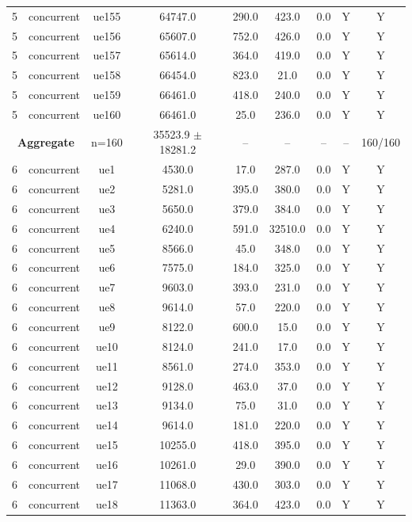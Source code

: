 \begin{table}[ht]
\begin{tabular}{|c|c|c|c|c|c|c|c|c|}
5 & concurrent & ue155 & 64747.0 & 290.0 & 423.0 & 0.0 & Y & Y \\
5 & concurrent & ue156 & 65607.0 & 752.0 & 426.0 & 0.0 & Y & Y \\
5 & concurrent & ue157 & 65614.0 & 364.0 & 419.0 & 0.0 & Y & Y \\
5 & concurrent & ue158 & 66454.0 & 823.0 & 21.0 & 0.0 & Y & Y \\
5 & concurrent & ue159 & 66461.0 & 418.0 & 240.0 & 0.0 & Y & Y \\
5 & concurrent & ue160 & 66461.0 & 25.0 & 236.0 & 0.0 & Y & Y \\
\multicolumn{2}{|c|}{\textbf{Aggregate}} & n=160 & 35523.9 $\pm$ 18281.2 & -- & -- & -- & -- & 160/160 \\
\hline
6 & concurrent & ue1 & 4530.0 & 17.0 & 287.0 & 0.0 & Y & Y \\
6 & concurrent & ue2 & 5281.0 & 395.0 & 380.0 & 0.0 & Y & Y \\
6 & concurrent & ue3 & 5650.0 & 379.0 & 384.0 & 0.0 & Y & Y \\
6 & concurrent & ue4 & 6240.0 & 591.0 & 32510.0 & 0.0 & Y & Y \\
6 & concurrent & ue5 & 8566.0 & 45.0 & 348.0 & 0.0 & Y & Y \\
6 & concurrent & ue6 & 7575.0 & 184.0 & 325.0 & 0.0 & Y & Y \\
6 & concurrent & ue7 & 9603.0 & 393.0 & 231.0 & 0.0 & Y & Y \\
6 & concurrent & ue8 & 9614.0 & 57.0 & 220.0 & 0.0 & Y & Y \\
6 & concurrent & ue9 & 8122.0 & 600.0 & 15.0 & 0.0 & Y & Y \\
6 & concurrent & ue10 & 8124.0 & 241.0 & 17.0 & 0.0 & Y & Y \\
6 & concurrent & ue11 & 8561.0 & 274.0 & 353.0 & 0.0 & Y & Y \\
6 & concurrent & ue12 & 9128.0 & 463.0 & 37.0 & 0.0 & Y & Y \\
6 & concurrent & ue13 & 9134.0 & 75.0 & 31.0 & 0.0 & Y & Y \\
6 & concurrent & ue14 & 9614.0 & 181.0 & 220.0 & 0.0 & Y & Y \\
6 & concurrent & ue15 & 10255.0 & 418.0 & 395.0 & 0.0 & Y & Y \\
6 & concurrent & ue16 & 10261.0 & 29.0 & 390.0 & 0.0 & Y & Y \\
6 & concurrent & ue17 & 11068.0 & 430.0 & 303.0 & 0.0 & Y & Y \\
6 & concurrent & ue18 & 11363.0 & 364.0 & 423.0 & 0.0 & Y & Y \\

\end{tabular}
\end{table}
